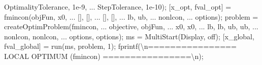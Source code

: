 \documentclass[
  letterpaper,
  DIV=11,
  numbers=noendperiod]{scrartcl}
\newenvironment{Shaded}{\begin{snugshade}}{\end{snugshade}}
\newcommand{\FloatTok}[1]{\textcolor[rgb]{0.68,0.00,0.00}{#1}}
\newcommand{\NormalTok}[1]{\textcolor[rgb]{0.00,0.23,0.31}{#1}}
\newcommand{\OperatorTok}[1]{\textcolor[rgb]{0.37,0.37,0.37}{#1}}
\newcommand{\SpecialStringTok}[1]{\textcolor[rgb]{0.13,0.47,0.30}{#1}}
\newcommand{\VariableTok}[1]{\textcolor[rgb]{0.07,0.07,0.07}{#1}}
\begin{document}
\begin{Shaded}
\begin{Highlighting}[]
    \SpecialStringTok{\textquotesingle{}OptimalityTolerance\textquotesingle{}}\OperatorTok{,} \FloatTok{1e{-}9}\OperatorTok{,} \OperatorTok{...}
    \SpecialStringTok{\textquotesingle{}StepTolerance\textquotesingle{}}\OperatorTok{,} \FloatTok{1e{-}10}\NormalTok{)}\OperatorTok{;}
\NormalTok{[}\VariableTok{x\_opt}\OperatorTok{,} \VariableTok{fval\_opt}\NormalTok{] }\OperatorTok{=} \VariableTok{fmincon}\NormalTok{(}\VariableTok{objFun}\OperatorTok{,} \VariableTok{x0}\OperatorTok{,} \OperatorTok{...}
\NormalTok{                            []}\OperatorTok{,}\NormalTok{ []}\OperatorTok{,} \OperatorTok{...}     
\NormalTok{                            []}\OperatorTok{,}\NormalTok{ []}\OperatorTok{,} \OperatorTok{...}     
                            \VariableTok{lb}\OperatorTok{,} \VariableTok{ub}\OperatorTok{,} \OperatorTok{...}     
                            \VariableTok{nonlcon}\OperatorTok{,} \OperatorTok{...}    
                            \VariableTok{options}\NormalTok{)}\OperatorTok{;}
\VariableTok{problem} \OperatorTok{=} \VariableTok{createOptimProblem}\NormalTok{(}\SpecialStringTok{\textquotesingle{}fmincon\textquotesingle{}}\OperatorTok{,} \OperatorTok{...}
    \SpecialStringTok{\textquotesingle{}objective\textquotesingle{}}\OperatorTok{,} \VariableTok{objFun}\OperatorTok{,} \OperatorTok{...}
    \SpecialStringTok{\textquotesingle{}x0\textquotesingle{}}\OperatorTok{,} \VariableTok{x0}\OperatorTok{,} \OperatorTok{...}
    \SpecialStringTok{\textquotesingle{}lb\textquotesingle{}}\OperatorTok{,} \VariableTok{lb}\OperatorTok{,} \SpecialStringTok{\textquotesingle{}ub\textquotesingle{}}\OperatorTok{,} \VariableTok{ub}\OperatorTok{,} \OperatorTok{...}
    \SpecialStringTok{\textquotesingle{}nonlcon\textquotesingle{}}\OperatorTok{,} \VariableTok{nonlcon}\OperatorTok{,} \OperatorTok{...}
    \SpecialStringTok{\textquotesingle{}options\textquotesingle{}}\OperatorTok{,} \VariableTok{options}\NormalTok{)}\OperatorTok{;}
\VariableTok{ms} \OperatorTok{=} \VariableTok{MultiStart}\NormalTok{(}\SpecialStringTok{\textquotesingle{}Display\textquotesingle{}}\OperatorTok{,} \SpecialStringTok{\textquotesingle{}off\textquotesingle{}}\NormalTok{)}\OperatorTok{;}
\NormalTok{[}\VariableTok{x\_global}\OperatorTok{,} \VariableTok{fval\_global}\NormalTok{] }\OperatorTok{=} \VariableTok{run}\NormalTok{(}\VariableTok{ms}\OperatorTok{,} \VariableTok{problem}\OperatorTok{,} \FloatTok{1}\NormalTok{)}\OperatorTok{;}
\VariableTok{fprintf}\NormalTok{(}\SpecialStringTok{\textquotesingle{}\textbackslash{}n================ LOCAL OPTIMUM (fmincon) ================\textbackslash{}n\textquotesingle{}}\NormalTok{)}\OperatorTok{;}

\end{Highlighting}
\end{Shaded}
\end{document}
